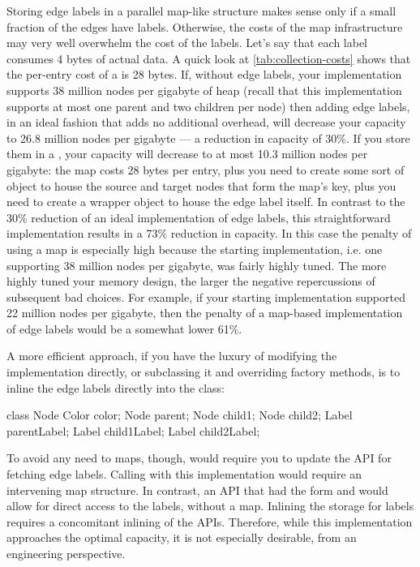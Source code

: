 Storing edge labels in a parallel map-like structure makes sense only if a small
fraction of the edges have labels. Otherwise, the costs of the map infrastructure
may very well overwhelm the cost of the labels. Let's say that each label
consumes 4 bytes of actual data. A quick look at
\autoref{tab:collection-costs} shows that the per-entry cost of a 
is 28 bytes. If, without edge labels, your implementation supports 38 million
nodes per gigabyte of heap (recall that this implementation supports at most
one parent and two children per node)
then adding edge labels, in an ideal fashion that adds no additional overhead,
will decrease your capacity to 26.8 million nodes per gigabyte --- a reduction
in capacity of 30\%.
If you store them in a , your capacity will decrease to at most
10.3 million nodes per gigabyte: the map costs 28 bytes per entry,
plus you need to create some sort of  object to house the source and
target nodes that form the map's key, plus you need to create a wrapper object to
house the edge label itself.
In contrast to the 30\% reduction of an ideal implementation of edge labels,
this straightforward implementation results in a 73\% reduction in capacity. In
this case the penalty of using a map is especially high because the starting
implementation, i.e. one supporting 38 million nodes per gigabyte, was fairly
highly tuned. The more highly tuned your memory design, the larger the negative
repercussions of subsequent bad choices. For example, if your starting
implementation supported 22 million nodes per gigabyte, then the penalty of a
map-based implementation of edge labels would be a somewhat lower 61\%.

A more efficient approach, if you have the luxury of modifying the 
implementation directly, or subclassing it and overriding factory methods, is to
inline the edge labels directly into the  class:
\begin{shortlisting}
class Node {
   Color color;
   Node parent;
   Node child1;
   Node child2;
   Label parentLabel;
   Label child1Label;
   Label child2Label;
}
\end{shortlisting} 
To avoid any need to maps, though, would require you to update the API for
fetching edge labels. Calling  with
this implementation would require an intervening map structure. In contrast,
an API that had the form  and
 would allow for direct access to the labels,
without a map. Inlining the storage for labels requires a concomitant inlining
of the APIs. Therefore, while this implementation
approaches the optimal capacity, it is not especially desirable, from an
engineering perspective.
 

